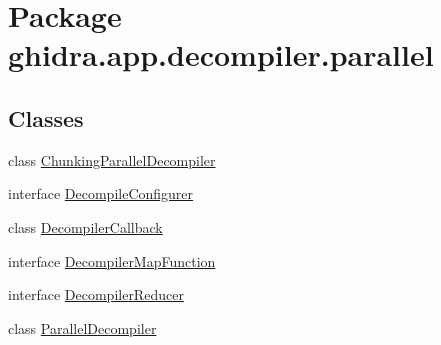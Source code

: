 \hypertarget{namespaceghidra_1_1app_1_1decompiler_1_1parallel}{}\section{Package ghidra.\+app.\+decompiler.\+parallel}
\label{namespaceghidra_1_1app_1_1decompiler_1_1parallel}
\subsection*{Classes}
\begin{DoxyCompactItemize}
\item 
class \mbox{\hyperlink{classghidra_1_1app_1_1decompiler_1_1parallel_1_1_chunking_parallel_decompiler}{Chunking\+Parallel\+Decompiler}}
\item 
interface \mbox{\hyperlink{interfaceghidra_1_1app_1_1decompiler_1_1parallel_1_1_decompile_configurer}{Decompile\+Configurer}}
\item 
class \mbox{\hyperlink{classghidra_1_1app_1_1decompiler_1_1parallel_1_1_decompiler_callback}{Decompiler\+Callback}}
\item 
interface \mbox{\hyperlink{interfaceghidra_1_1app_1_1decompiler_1_1parallel_1_1_decompiler_map_function}{Decompiler\+Map\+Function}}
\item 
interface \mbox{\hyperlink{interfaceghidra_1_1app_1_1decompiler_1_1parallel_1_1_decompiler_reducer}{Decompiler\+Reducer}}
\item 
class \mbox{\hyperlink{classghidra_1_1app_1_1decompiler_1_1parallel_1_1_parallel_decompiler}{Parallel\+Decompiler}}
\end{DoxyCompactItemize}
